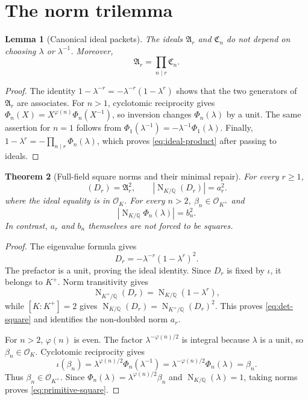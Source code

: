 \documentclass[11pt]{article}
\newtheorem{theorem}{Theorem}[section]
\newtheorem{lemma}[theorem]{Lemma}
\theoremstyle{definition}\newtheorem{definition}[theorem]{Definition}
\theoremstyle{remark}\newtheorem{remark}[theorem]{Remark}
\DeclareMathOperator{\FieldNorm}{N}
\begin{document}
\section{The norm trilemma}

\begin{lemma}[Canonical ideal packets]\label{lem:canonical}
The ideals $\mathfrak A_r$ and $\mathfrak C_n$ do not depend on choosing
$\lambda$ or $\lambda^{-1}$.  Moreover,
\begin{equation}\label{eq:ideal-product}
\mathfrak A_r=\prod_{n\mid r}\mathfrak C_n.
\end{equation}
\end{lemma}
\begin{proof}
The identity
$1-\lambda^{-r}=-\lambda^{-r}(1-\lambda^r)$ shows that the two generators
of $\mathfrak A_r$ are associates.  For $n>1$, cyclotomic reciprocity gives
$\Phi_n(X)=X^{\varphi(n)}\Phi_n(X^{-1})$, so inversion changes
$\Phi_n(\lambda)$ by a unit.  The same assertion for $n=1$ follows from
$\Phi_1(\lambda^{-1})=-\lambda^{-1}\Phi_1(\lambda)$.  Finally,
$1-\lambda^r=-\prod_{n\mid r}\Phi_n(\lambda)$, which proves
\eqref{eq:ideal-product} after passing to ideals.
\end{proof}

\begin{theorem}[Full-field square norms and their minimal repair]
\label{thm:square}
For every $r\ge1$,
\begin{equation}\label{eq:det-square}
(D_r)=\mathfrak A_r^2,
\qquad
\left|\FieldNorm_{K/\mathbb Q}(D_r)\right|=a_r^2.
\end{equation}
where the ideal equality is in $\mathcal O_K$.
For every $n>2$, $\beta_n\in\mathcal O_{K^+}$ and
\begin{equation}\label{eq:primitive-square}
\left|\FieldNorm_{K/\mathbb Q}\Phi_n(\lambda)\right|=b_n^2.
\end{equation}
In contrast, $a_r$ and $b_n$ themselves are not forced to be squares.
\end{theorem}
\begin{proof}
The eigenvalue formula gives
\[
D_r=-\lambda^{-r}(1-\lambda^r)^2.
\]
The prefactor is a unit, proving the ideal identity.  Since $D_r$ is fixed by
$\iota$, it belongs to $K^+$.  Norm transitivity gives
\[
\FieldNorm_{K^+/\mathbb Q}(D_r)
=\FieldNorm_{K/\mathbb Q}(1-\lambda^r),
\]
while $[K:K^+]=2$ gives
$\FieldNorm_{K/\mathbb Q}(D_r)=\FieldNorm_{K^+/\mathbb Q}(D_r)^2$.
This proves \eqref{eq:det-square} and identifies the non-doubled norm $a_r$.

For $n>2$, $\varphi(n)$ is even.  The factor
$\lambda^{-\varphi(n)/2}$ is integral because $\lambda$ is a unit, so
$\beta_n\in\mathcal O_K$.  Cyclotomic reciprocity gives
\[
\iota(\beta_n)
=\lambda^{\varphi(n)/2}\Phi_n(\lambda^{-1})
=\lambda^{-\varphi(n)/2}\Phi_n(\lambda)=\beta_n.
\]
Thus $\beta_n\in\mathcal O_{K^+}$.  Since
$\Phi_n(\lambda)=\lambda^{\varphi(n)/2}\beta_n$ and
$\FieldNorm_{K/\mathbb Q}(\lambda)=1$, taking norms proves
\eqref{eq:primitive-square}.
\end{proof}
\end{document}
